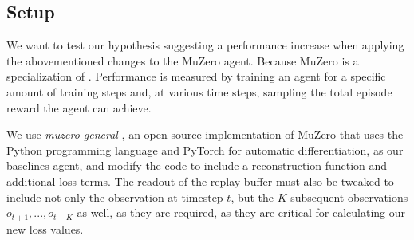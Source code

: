 \subsection{Setup}
We want to test our hypothesis suggesting a performance increase when applying the abovementioned changes to the MuZero agent. Because MuZero is a specialization of . Performance is measured by training an agent for a specific amount of training steps and, at various time steps, sampling the total episode reward the agent can achieve.

We use \textit{muzero-general} \cite{muzero-general}, an open source implementation of MuZero that uses the Python programming language and PyTorch for automatic differentiation, as our baselines agent, and modify the code to include a reconstruction function and additional loss terms. The readout of the replay buffer must also be tweaked to include not only the observation at timestep $t$, but the $K$ subsequent observations $o_{t+1}, ..., o_{t+K}$ as well, as they are required, as they are critical for calculating our new loss values.

